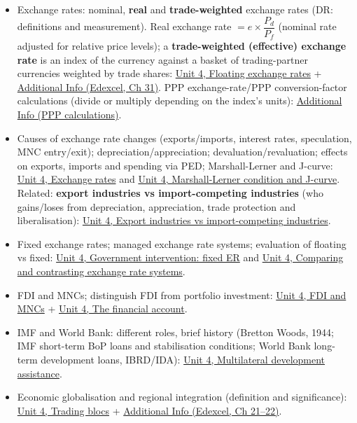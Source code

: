 \documentclass[a4paper,12pt]{article}
\begin{document}
\begin{itemize}
  \item Exchange rates: nominal, \textbf{real} and \textbf{trade-weighted} exchange rates (DR: definitions and measurement). Real exchange rate $= e \times \dfrac{P_d}{P_f}$ (nominal rate adjusted for relative price levels); a \textbf{trade-weighted (effective) exchange rate} is an index of the currency against a basket of trading-partner currencies weighted by trade shares: \hyperref[sec:exchange-rates]{Unit 4, Floating exchange rates} + \hyperref[sec:add-competitiveness]{Additional Info (Edexcel, Ch 31)}. PPP exchange-rate/PPP conversion-factor calculations (divide or multiply depending on the index's units): \hyperref[sec:add-ppp]{Additional Info (PPP calculations)}.
  \item Causes of exchange rate changes (exports/imports, interest rates, speculation, MNC entry/exit); depreciation/appreciation; devaluation/revaluation; effects on exports, imports and spending via PED; Marshall-Lerner and J-curve: \hyperref[sec:exchange-rates]{Unit 4, Exchange rates} and \hyperref[sec:further-ER]{Unit 4, Marshall-Lerner condition and J-curve}. Related: \textbf{export industries vs import-competing industries} (who gains/loses from depreciation, appreciation, trade protection and liberalisation): \hyperref[sec:exchange-rates]{Unit 4, Export industries vs import-competing industries}.
  \item Fixed exchange rates; managed exchange rate systems; evaluation of floating vs fixed: \hyperref[sec:exchange-rates]{Unit 4, Government intervention: fixed ER} and \hyperref[sec:further-ER]{Unit 4, Comparing and contrasting exchange rate systems}.
  \item FDI and MNCs; distinguish FDI from portfolio investment: \hyperref[sec:strategies]{Unit 4, FDI and MNCs} + \hyperref[sec:exchange-rates]{Unit 4, The financial account}.
  \item IMF and World Bank: different roles, brief history (Bretton Woods, 1944; IMF short-term BoP loans and stabilisation conditions; World Bank long-term development loans, IBRD/IDA): \hyperref[sec:strategies]{Unit 4, Multilateral development assistance}.
  \item Economic globalisation and regional integration (definition and significance): \hyperref[sec:trade-2]{Unit 4, Trading blocs} + \hyperref[sec:add-global]{Additional Info (Edexcel, Ch 21--22)}.
\end{itemize}
\end{document}
